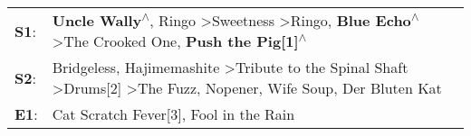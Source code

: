 \begin{supertabular}{p{0.03\textwidth}p{0.92\textwidth}}
 \textbf{S1}:  &       \textbf{Uncle Wally\textsuperscript{$\wedge$}}, \enspace Ringo\textsuperscript{} \textgreater \enspace Sweetness\textsuperscript{} \textgreater \enspace Ringo\textsuperscript{}, \enspace \textbf{Blue Echo\textsuperscript{$\wedge$}} \textgreater \enspace The Crooked One\textsuperscript{}, \enspace \textbf{Push the Pig[1]\textsuperscript{$\wedge$}}  \enspace  \\
 \textbf{S2}:  &  Bridgeless\textsuperscript{}, \enspace Hajimemashite\textsuperscript{} \textgreater \enspace Tribute to the Spinal Shaft\textsuperscript{} \textgreater \enspace Drums[2]\textsuperscript{} \textgreater \enspace The Fuzz\textsuperscript{}, \enspace Nopener\textsuperscript{}, \enspace Wife Soup\textsuperscript{}, \enspace Der Bluten Kat\textsuperscript{}  \enspace  \\
 \textbf{E1}:  &                                                                                                                                                                                                                                                                                Cat Scratch Fever[3]\textsuperscript{}, \enspace Fool in the Rain\textsuperscript{}  \enspace  \\
\end{supertabular}
